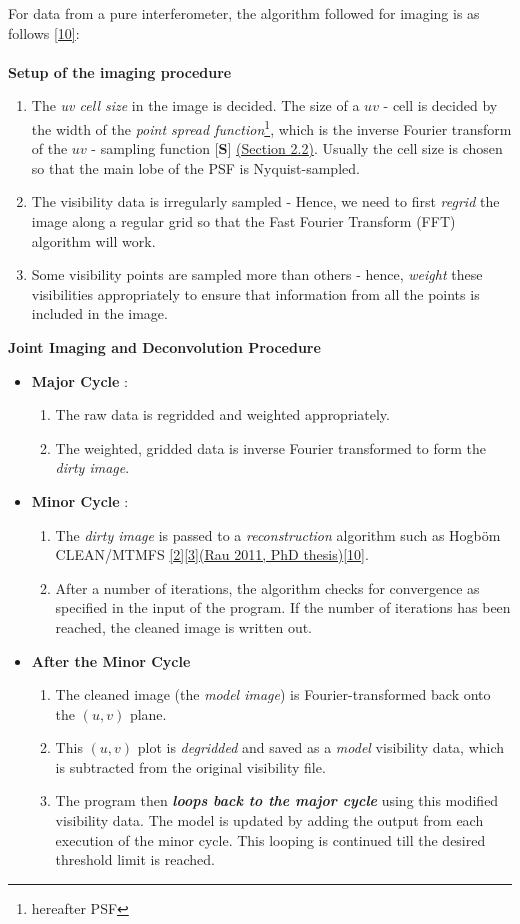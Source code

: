 \documentclass{article}
\begin{document}
For data from a pure interferometer, the algorithm followed for imaging is as follows \hyperref[ref10]{[10]}: \\\\
 \textbf{Setup of the imaging procedure}
\begin{enumerate}
\item The \textit{uv cell size} in the image is decided. The size of a $uv$ - cell is decided by the width of the \textit{point spread function}\footnote{hereafter PSF}, which is the inverse Fourier transform of the $uv$ - sampling function $\textbf{[S]}$ \hyperref[section2.2]{(Section 2.2)}. Usually the cell size is chosen so that the main lobe of the PSF is Nyquist-sampled.
\item The visibility data is irregularly sampled - Hence, we need to first \textit{regrid} the image along a regular grid so that the Fast Fourier Transform (FFT) algorithm will work.
\item Some visibility points are sampled more than others - hence, \textit{weight} these visibilities appropriately to ensure that information from all the points is included in the image.
\end{enumerate}
\textbf{Joint Imaging and Deconvolution Procedure}
\begin{itemize}
\item \textbf{Major Cycle} : 
\begin{enumerate}
\item The raw data is regridded and weighted appropriately.
\item The weighted, gridded data is inverse Fourier transformed to form the \textit{dirty image}. 
\end{enumerate}
\item \textbf{Minor Cycle} : 
\begin{enumerate}
\item The \textit{dirty image} is passed to a \textit{reconstruction} algorithm such as Hogb\"{o}m CLEAN/MTMFS \hyperref[ref2]{[2]}\hyperref[ref3]{[3]}\hyperref[urvthesis]{(Rau 2011, PhD thesis)}\hyperref[ref10]{[10]}. 
\item After a number of iterations, the algorithm checks for convergence as specified in the input of the program. If the number of iterations has been reached, the cleaned image is written out. 
\end{enumerate}
\item \textbf{After the Minor Cycle}
\begin{enumerate}
\item The cleaned image (the \textit{model image}) is Fourier-transformed back onto the $(u,v)$ plane.
\item This $(u,v)$ plot is \textit{degridded} and saved as a \textit{model} visibility data, which is subtracted from the original visibility file.
\item The program then \textit{\textbf{loops back to the major cycle}} using this modified visibility data. The model is updated by adding the output from each execution of the minor cycle. This looping is continued till the desired threshold limit is reached. 
\end{enumerate}
\end{itemize}
\end{document}
